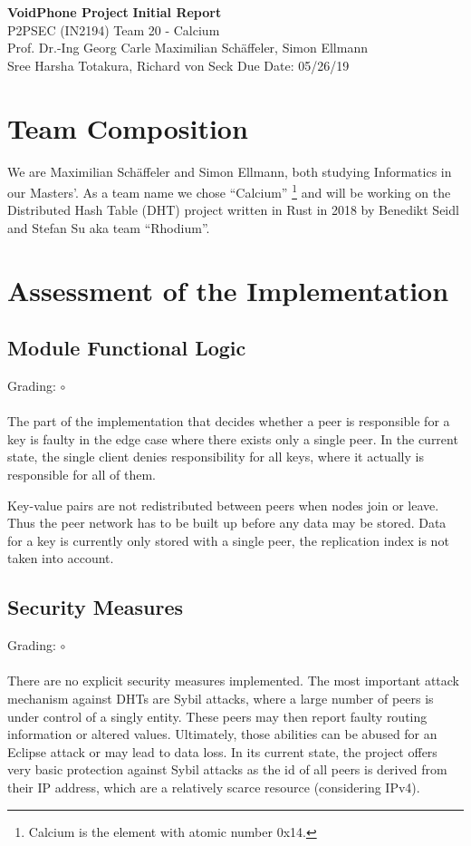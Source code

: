 \documentclass[a4paper, 11pt]{article}
\begin{document}
\noindent
\large\textbf{VoidPhone Project} \hfill \textbf{Initial Report} \\
\normalsize P2PSEC (IN2194)  \hfill Team 20 - Calcium\\
Prof. Dr.-Ing Georg Carle \hfill Maximilian Schäffeler, Simon Ellmann \\
Sree Harsha Totakura, Richard von Seck \hfill Due Date: 05/26/19


\section*{Team Composition}
We are Maximilian Schäffeler and Simon Ellmann, both studying Informatics in our Masters'.
As a team name we chose ``Calcium'' \footnote{Calcium is the element with atomic number 0x14.} and will be working on the Distributed Hash Table (DHT) project written in Rust \cite{Rust} in 2018 by Benedikt Seidl and Stefan Su aka team ``Rhodium''.


\section*{Assessment of the Implementation}
\subsection*{Module Functional Logic}
Grading: $\circ$\\
\\
The part of the implementation that decides whether a peer is responsible for a key is faulty in the edge case where there exists only a single peer. 
In the current state, the single client denies responsibility for all keys, where it actually is responsible for all of them.

Key-value pairs are not redistributed between peers when nodes join or leave. Thus the peer network has to be built up before any data may be stored.
Data for a key is currently only stored with a single peer, the replication index is not taken into account.

\subsection*{Security Measures}
Grading: $\circ$\\
\\
There are no explicit security measures implemented.
The most important attack mechanism against DHTs are Sybil attacks, where a large number of peers is under control of a singly entity. 
These peers may then report faulty routing information or altered values. 
Ultimately, those abilities can be abused for an Eclipse attack or may lead to data loss.
In its current state, the project offers very basic protection against Sybil attacks as the id of all peers is derived from their IP address, which are a relatively scarce resource (considering IPv4).
\end{document}
